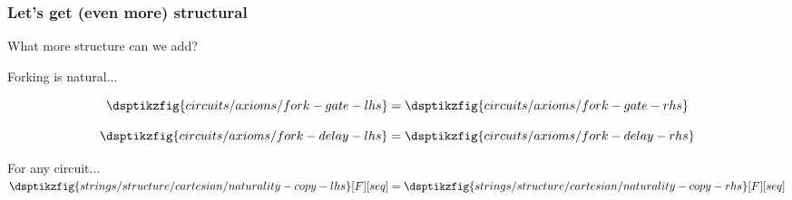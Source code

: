 \begin{frame}
    \frametitle{Let's get (even more) structural}

    What more structure can we add?

    \wait

    \alert{Forking} is natural...

    \wait

    \begin{axiom}
        \begin{minipage}{0.33\textwidth}
            \begin{equation*}
                \dsptikzfig{circuits/axioms/fork-gate-lhs}
                =
                \dsptikzfig{circuits/axioms/fork-gate-rhs}
            \end{equation*}
        \end{minipage}
        \begin{minipage}{0.33\textwidth}
            \begin{equation*}
                \dsptikzfig{circuits/axioms/fork-delay-lhs}
                =
                \dsptikzfig{circuits/axioms/fork-delay-rhs}
            \end{equation*}
        \end{minipage}
    \end{axiom}

    For any circuit...
    \(
        \dsptikzfig{strings/structure/cartesian/naturality-copy-lhs}[F][seq]
        =
        \dsptikzfig{strings/structure/cartesian/naturality-copy-rhs}[F][seq]
    \)
\end{frame}
